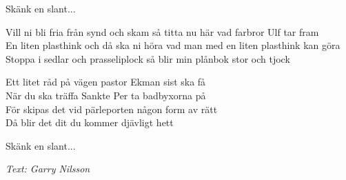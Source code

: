 Skänk en slant...\par
\vspace{10pt}
Vill ni bli fria från synd och skam så titta nu här vad farbror Ulf tar fram\\
En liten plasthink och då ska ni höra vad man med en liten plasthink kan göra\\
Stoppa i sedlar och prasseliplock så blir min plånbok stor och tjock\par
\vspace{10pt}
Ett litet råd på vägen pastor Ekman sist ska få\\
När du ska träffa Sankte Per ta badbyxorna på\\
För skipas det vid pärleporten någon form av rätt\\
Då blir det dit du kommer djävligt hett\par
\vspace{10pt}
Skänk en slant...\par
\vspace{10pt}
{\footnotesize\textit{Text: Garry Nilsson}}
